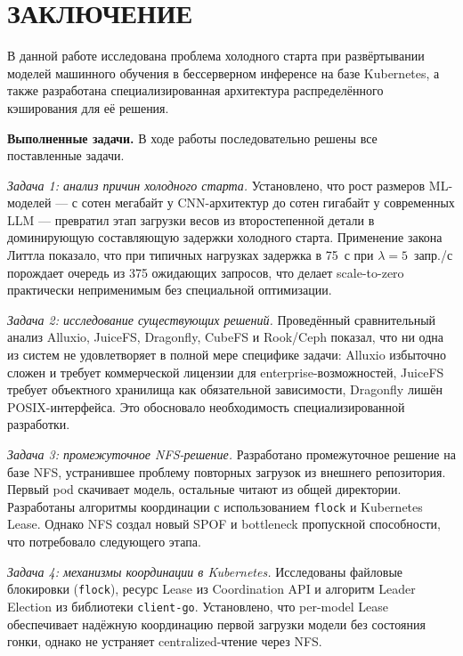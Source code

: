 \chapter*{ЗАКЛЮЧЕНИЕ}

В данной работе исследована проблема холодного старта при развёртывании моделей машинного обучения в бессерверном инференсе на базе Kubernetes, а также разработана специализированная архитектура распределённого кэширования для её решения.

\textbf{Выполненные задачи.} В ходе работы последовательно решены все поставленные задачи.

\textit{Задача 1: анализ причин холодного старта.} Установлено, что рост размеров ML-моделей --- с сотен мегабайт у CNN-архитектур до сотен гигабайт у современных LLM --- превратил этап загрузки весов из второстепенной детали в доминирующую составляющую задержки холодного старта. Применение закона Литтла показало, что при типичных нагрузках задержка в 75~с при $\lambda = 5$~запр./с порождает очередь из 375 ожидающих запросов, что делает scale-to-zero практически неприменимым без специальной оптимизации.

\textit{Задача 2: исследование существующих решений.} Проведённый сравнительный анализ Alluxio, JuiceFS, Dragonfly, CubeFS и Rook/Ceph показал, что ни одна из систем не удовлетворяет в полной мере специфике задачи: Alluxio избыточно сложен и требует коммерческой лицензии для enterprise-возможностей, JuiceFS требует объектного хранилища как обязательной зависимости, Dragonfly лишён POSIX-интерфейса. Это обосновало необходимость специализированной разработки.

\textit{Задача 3: промежуточное NFS-решение.} Разработано промежуточное решение на базе NFS, устранившее проблему повторных загрузок из внешнего репозитория. Первый pod скачивает модель, остальные читают из общей директории. Разработаны алгоритмы координации с использованием \texttt{flock} и Kubernetes Lease. Однако NFS создал новый SPOF и bottleneck пропускной способности, что потребовало следующего этапа.

\textit{Задача 4: механизмы координации в Kubernetes.} Исследованы файловые блокировки (\texttt{flock}), ресурс Lease из Coordination API и алгоритм Leader Election из библиотеки \texttt{client-go}. Установлено, что per-model Lease обеспечивает надёжную координацию первой загрузки модели без состояния гонки, однако не устраняет centralized-чтение через NFS.

